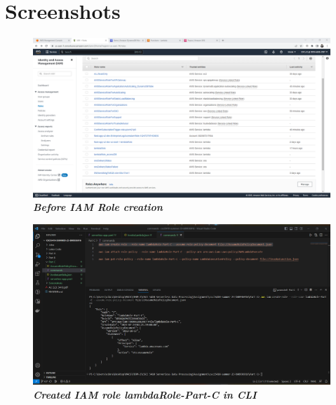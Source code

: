 \section{Screenshots}

    \begin{figure}[htp]
        \centering
        \includegraphics[scale=1, width=15cm]{PROBLEM 3/Screenshots/1. before role creation.png}
        \caption{\textbf{\textit{Before IAM Role creation}}}
        \label{fig:}
    \end{figure}

    \begin{figure}[htp]
        \centering
        \includegraphics[scale=1, width=15cm]{PROBLEM 3/Screenshots/1.2 created role lambdaRole-Part-C in CLI.png}
        \caption{\textbf{\textit{Created IAM role lambdaRole-Part-C in CLI}}}
        \label{fig:}
    \end{figure}

